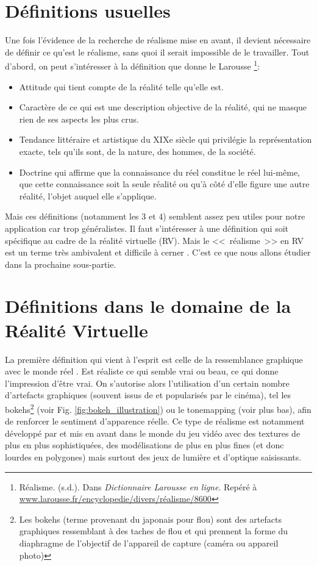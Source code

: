 	\section{Définitions usuelles}
	\par Une fois l'évidence de la recherche de réalisme mise en avant, il devient nécessaire de définir ce qu'est le réalisme, sans quoi il serait impossible de le travailler. Tout d'abord, on peut s'intéresser à la définition que donne le Larousse \footnote{Réalisme. (s.d.). Dans \textit{Dictionnaire Larousse en ligne}. Repéré à \url{www.larousse.fr/encyclopedie/divers/réalisme/8600}}:
	\begin{itemize}
		\item Attitude qui tient compte de la réalité telle qu'elle est.
		\item Caractère de ce qui est une description objective de la réalité, qui ne masque rien de ses aspects les plus crus.
		\item Tendance littéraire et artistique du XIXe siècle qui privilégie la représentation exacte, tels qu'ils sont, de la nature, des hommes, de la société.
		\item Doctrine qui affirme que la connaissance du réel constitue le réel lui-même, que cette connaissance soit la seule réalité ou qu'à côté d'elle figure une autre réalité, l'objet auquel elle s'applique.
	\end{itemize}
	
	\par Mais ces définitions (notamment les 3 et 4) semblent assez peu utiles pour notre application car trop généralistes. Il faut s'intéresser à une définition qui soit spécifique au cadre de la réalité virtuelle (RV). Mais le <<~réalisme~>> en RV est un terme très ambivalent et difficile à cerner \citep{burkhardt_realite_2003}. C'est ce que nous allons étudier dans la prochaine sous-partie.
	
	\section{Définitions dans le domaine de la Réalité Virtuelle}	
	\par La première définition qui vient à l'esprit est celle de la ressemblance graphique avec le monde réel \citep{ferwerda_model_1996}. Est réaliste ce qui semble vrai ou beau, ce qui donne l'impression d'être vrai. On s'autorise alors l'utilisation d'un certain nombre d'artefacts graphiques (souvent issus de et popularisés par le cinéma), tel les bokehs\footnote{Les bokehs (terme provenant du japonais pour flou) sont des artefacts graphiques ressemblant à des taches de flou et qui prennent la forme du diaphragme de l'objectif de l'appareil de capture (caméra ou appareil photo)} (voir Fig. \ref{fig:bokeh_illustration}) ou le tonemapping (voir plus bas), afin de renforcer le sentiment d'apparence réelle. Ce type de réalisme est notamment développé par et mis en avant dans le monde du jeu vidéo avec des textures de plus en plus sophistiquées, des modélisations de plus en plus fines (et donc lourdes en polygones) mais surtout des jeux de lumière et d'optique saisissants.
	
